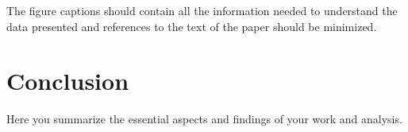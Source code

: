 \documentclass[a4paper,10pt]{article}
\begin{document}
The figure captions should contain all the information needed to 
understand the data presented and references to the text of the paper 
should be minimized.




\section{Conclusion}
Here you summarize the essential aspects and findings 
of your work and analysis.
\end{document}
